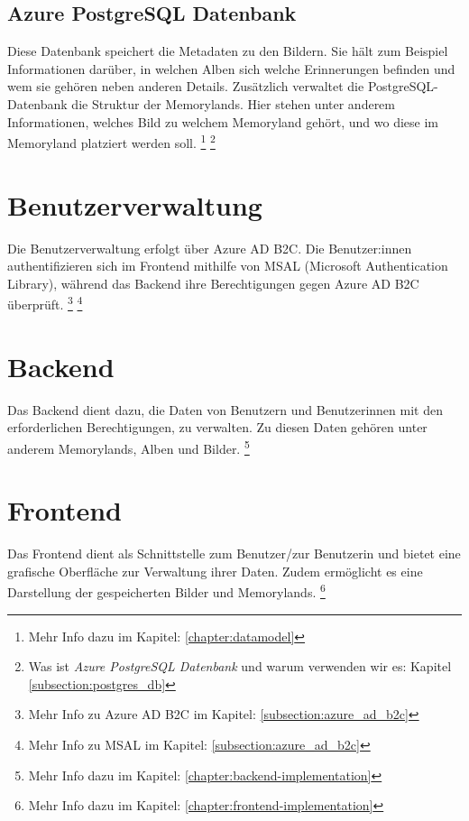 \subsection{Azure PostgreSQL Datenbank}

Diese Datenbank speichert die Metadaten zu den Bildern. 
Sie hält zum Beispiel Informationen darüber, in welchen Alben sich welche Erinnerungen befinden
und wem sie gehören neben anderen Details. Zusätzlich verwaltet die PostgreSQL-Datenbank die 
Struktur der Memorylands. Hier stehen unter anderem Informationen, welches Bild zu welchem 
Memoryland gehört, und wo diese im Memoryland platziert werden soll.
\footnote{Mehr Info dazu im Kapitel: \ref{chapter:datamodel}}
\footnote{Was ist \emph{Azure PostgreSQL Datenbank} und warum verwenden wir es: Kapitel \ref{subsection:postgres_db}}

\section{Benutzerverwaltung}

Die Benutzerverwaltung erfolgt über Azure AD B2C. Die Benutzer:innen authentifizieren sich 
im Frontend mithilfe von MSAL (Microsoft Authentication Library), während das Backend 
ihre Berechtigungen gegen Azure AD B2C überprüft.
\footnote{Mehr Info zu Azure AD B2C im Kapitel: \ref{subsection:azure_ad_b2c}}
\footnote{Mehr Info zu MSAL im Kapitel: \ref{subsection:azure_ad_b2c}}

\section{Backend}

Das Backend dient dazu, die Daten von Benutzern und Benutzerinnen mit den erforderlichen
Berechtigungen, zu verwalten. Zu diesen Daten gehören unter anderem Memorylands, 
Alben und Bilder. \footnote{Mehr Info dazu im Kapitel: \ref{chapter:backend-implementation}}

\section{Frontend}

Das Frontend dient als Schnittstelle zum Benutzer/zur Benutzerin und bietet eine grafische 
Oberfläche zur Verwaltung ihrer Daten. Zudem ermöglicht es eine Darstellung 
der gespeicherten Bilder und Memorylands.
\footnote{Mehr Info dazu im Kapitel: \ref{chapter:frontend-implementation}}

